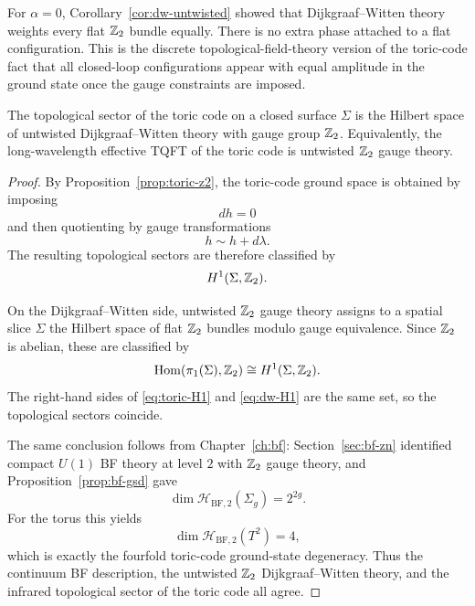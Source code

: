 \begin{remark}\label{rem:dw-z2-untwisted}
For $\alpha=0$, Corollary~\ref{cor:dw-untwisted} showed that Dijkgraaf--Witten theory weights every flat $\mathbb{Z}_2$ bundle equally. There is no extra phase attached to a flat configuration. This is the discrete topological-field-theory version of the toric-code fact that all closed-loop configurations appear with equal amplitude in the ground state once the gauge constraints are imposed.
\end{remark}

\begin{proposition}\label{prop:toric-dw}
The topological sector of the toric code on a closed surface $\Sigma$ is the Hilbert space of untwisted Dijkgraaf--Witten theory with gauge group $\mathbb{Z}_2$. Equivalently, the long-wavelength effective TQFT of the toric code is untwisted $\mathbb{Z}_2$ gauge theory.
\end{proposition}

\begin{proof}
By Proposition~\ref{prop:toric-z2}, the toric-code ground space is obtained by imposing
\begin{equation*}
dh=0
\end{equation*}
and then quotienting by gauge transformations
\begin{equation*}
h\sim h+d\lambda.
\end{equation*}
The resulting topological sectors are therefore classified by
\begin{equation}\label{eq:toric-H1}
H^1(\Sigma,\mathbb{Z}_2).
\end{equation}

\medskip

\noindent On the Dijkgraaf--Witten side, untwisted $\mathbb{Z}_2$ gauge theory assigns to a spatial slice $\Sigma$ the Hilbert space of flat $\mathbb{Z}_2$ bundles modulo gauge equivalence. Since $\mathbb{Z}_2$ is abelian, these are classified by
\begin{equation}\label{eq:dw-H1}
\operatorname{Hom}(\pi_1(\Sigma),\mathbb{Z}_2)\cong H^1(\Sigma,\mathbb{Z}_2).
\end{equation}
The right-hand sides of \eqref{eq:toric-H1} and \eqref{eq:dw-H1} are the same set, so the topological sectors coincide.

\medskip

\noindent The same conclusion follows from Chapter~\ref{ch:bf}: Section~\ref{sec:bf-zn} identified compact $U(1)$ BF theory at level $2$ with $\mathbb{Z}_2$ gauge theory, and Proposition~\ref{prop:bf-gsd} gave
\begin{equation*}
\dim \mathcal{H}_{\mathrm{BF},2}(\Sigma_g)=2^{2g}.
\end{equation*}
For the torus this yields
\begin{equation*}
\dim \mathcal{H}_{\mathrm{BF},2}(T^2)=4,
\end{equation*}
which is exactly the fourfold toric-code ground-state degeneracy. Thus the continuum BF description, the untwisted $\mathbb{Z}_2$ Dijkgraaf--Witten theory, and the infrared topological sector of the toric code all agree.
\end{proof}

